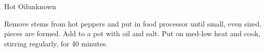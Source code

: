 \begin{recipe}{Hot Oil}{unknown}{}


    Remove stems from hot peppers and put in food processor until small, even sized, pieces are formed. Add to a pot with oil and salt. Put on med-low heat and cook, stirring regularly, for 40 minutes.
\end{recipe}